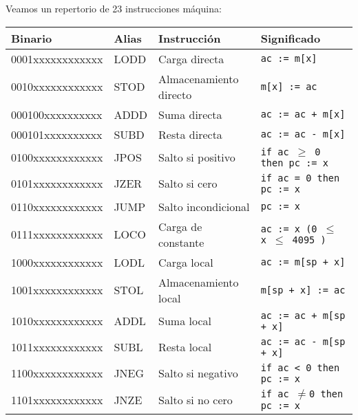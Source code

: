 Veamos un repertorio de 23 instrucciones máquina:
\begin{table}[ht!]
\centering
\setlength{\arrayrulewidth}{0.5mm}
\begin{tabular}{|l|l|p{3.3cm}|p{5cm}}
\hline
\rowcolor[HTML]{D5E8D4} \textbf{Binario} & \textbf{Alias} & \textbf{Instrucción} & \textbf{Significado} \\
\hline
\rowcolor[HTML]{D5E8D4} 0001xxxxxxxxxxxx & LODD  & Carga directa             & \texttt{ac := m[x]} \\
\hline
\rowcolor[HTML]{D5E8D4} 0010xxxxxxxxxxxx & STOD  & Almacenamiento directo   & \texttt{m[x] := ac} \\
\hline
\rowcolor[HTML]{D5E8D4} 000100xxxxxxxxxx & ADDD  & Suma directa             & \texttt{ac := ac + m[x]} \\
\hline
\rowcolor[HTML]{D5E8D4} 000101xxxxxxxxxx & SUBD  & Resta directa            & \texttt{ac := ac - m[x]} \\
\hline
\rowcolor[HTML]{D5E8D4} 0100xxxxxxxxxxxx & JPOS  & Salto si positivo        & \texttt{if ac $\geq$ 0 then pc := x} \\
\hline
\rowcolor[HTML]{D5E8D4} 0101xxxxxxxxxxxx & JZER  & Salto si cero            & \texttt{if ac = 0 then pc := x} \\
\hline
\rowcolor[HTML]{D5E8D4} 0110xxxxxxxxxxxx & JUMP  & Salto incondicional      & \texttt{pc := x} \\
\hline
\rowcolor[HTML]{D5E8D4} 0111xxxxxxxxxxxx & LOCO  & Carga de constante       & \texttt{ac := x (0 $\leq$ x $\leq$ 4095 )} \\
\hline
\rowcolor[HTML]{D5E8D4} 1000xxxxxxxxxxxx & LODL  & Carga local              & \texttt{ac := m[sp + x]} \\
\hline
\rowcolor[HTML]{D5E8D4} 1001xxxxxxxxxxxx & STOL  & Almacenamiento local     & \texttt{m[sp + x] := ac} \\
\hline
\rowcolor[HTML]{D5E8D4} 1010xxxxxxxxxxxx & ADDL  & Suma local               & \texttt{ac := ac + m[sp + x]} \\
\hline
\rowcolor[HTML]{D5E8D4} 1011xxxxxxxxxxxx & SUBL  & Resta local              & \texttt{ac := ac - m[sp + x]} \\
\hline
\rowcolor[HTML]{D5E8D4} 1100xxxxxxxxxxxx & JNEG  & Salto si negativo        & \texttt{if ac < 0 then pc := x} \\
\hline
\rowcolor[HTML]{D5E8D4} 1101xxxxxxxxxxxx & JNZE  & Salto si no cero         & \texttt{if ac $\neq $0 then pc := x} \\

\end{tabular}
\end{table}
